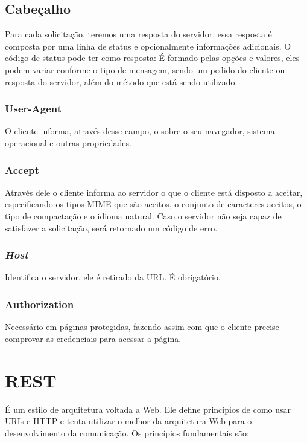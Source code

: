\subsection{Cabeçalho}
Para cada solicitação, teremos uma resposta do servidor, essa resposta é composta por uma linha de status e opcionalmente informações adicionais. O código de status pode ter como resposta:
É formado pelas opções e valores, eles podem variar conforme o tipo de mensagem, sendo um pedido do cliente ou resposta do servidor, além do método que está sendo utilizado.

\subsubsection{User-Agent}
O cliente informa, através desse campo, o sobre o seu navegador, sistema operacional e outras propriedades.

\subsubsection{Accept}
Através dele o cliente informa ao servidor o que o cliente está disposto a aceitar, especificando os tipos MIME que são aceitos, o conjunto de caracteres aceitos, o tipo de compactação e o idioma natural. Caso o servidor não seja capaz de satisfazer a solicitação, será retornado um código de erro.

\subsubsection{\textit{Host}}
Identifica o servidor, ele é retirado da URL. É obrigatório.

\subsubsection{Authorization}
Necessário em páginas protegidas, fazendo assim com que o cliente precise comprovar as credenciais para acessar a página.

\section{REST}
É um estilo de arquitetura voltada a Web. Ele define princípios de como usar URIs e HTTP e tenta utilizar o melhor da arquitetura Web para o desenvolvimento da comunicação. Os princípios fundamentais são:

